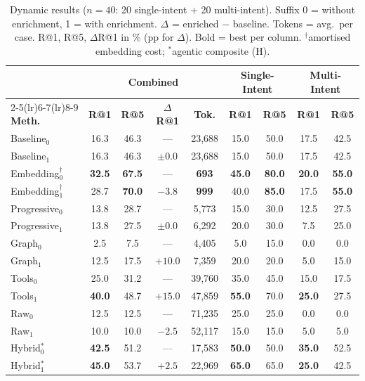\begin{table}[h]
  \renewcommand{\arraystretch}{1.0}
  \caption{Dynamic results ($n{=}40$: 20 single-intent + 20 multi-intent). Suffix 0 = without enrichment, 1 = with enrichment. $\Delta$ = enriched $-$ baseline. Tokens = avg.\ per case. R@1, R@5, $\Delta$R@1 in \% (pp for $\Delta$). Bold = best per column. $^{\dagger}$amortised embedding cost; $^{*}$agentic composite (H).}
  \label{tab:dy-results}
  \centering\footnotesize
  \setlength{\tabcolsep}{5pt}
  \begin{tabular}{@{} l cccc cc cc @{}}
  \toprule
  & \multicolumn{4}{c}{\textbf{Combined}} & \multicolumn{2}{c}{\textbf{Single-Intent}} & \multicolumn{2}{c}{\textbf{Multi-Intent}} \\
  \cmidrule(lr){2-5}\cmidrule(lr){6-7}\cmidrule(lr){8-9}
  \textbf{Meth.} & \textbf{R@1} & \textbf{R@5} & \textbf{$\Delta$R@1} & \textbf{Tok.} & \textbf{R@1} & \textbf{R@5} & \textbf{R@1} & \textbf{R@5} \\
  \midrule
  Baseline$_0$ & 16.3 & 46.3 & --- & 23{,}688 & 15.0 & 50.0 & 17.5 & 42.5 \\
  Baseline$_1$ & 16.3 & 46.3 & $\pm$0.0 & 23{,}688 & 15.0 & 50.0 & 17.5 & 42.5 \\
  \midrule
  Embedding$_0^{\dagger}$ & \textbf{32.5} & \textbf{67.5} & --- & \textbf{693} & \textbf{45.0} & \textbf{80.0} & \textbf{20.0} & \textbf{55.0} \\
  Embedding$_1^{\dagger}$ & 28.7 & \textbf{70.0} & $-3.8$ & \textbf{999} & 40.0 & \textbf{85.0} & 17.5 & \textbf{55.0} \\
  \midrule
  Progressive$_0$ & 13.8 & 28.7 & --- & 5{,}773 & 15.0 & 30.0 & 12.5 & 27.5 \\
  Progressive$_1$ & 13.8 & 27.5 & $\pm$0.0 & 6{,}292 & 20.0 & 30.0 & 7.5 & 25.0 \\
  \midrule
  Graph$_0$ & 2.5 & 7.5 & --- & 4{,}405 & 5.0 & 15.0 & 0.0 & 0.0 \\
  Graph$_1$ & 12.5 & 17.5 & $+10.0$ & 7{,}359 & 20.0 & 20.0 & 5.0 & 15.0 \\
  \midrule
  Tools$_0$ & 25.0 & 31.2 & --- & 39{,}760 & 35.0 & 45.0 & 15.0 & 17.5 \\
  Tools$_1$ & \textbf{40.0} & 48.7 & \textbf{$+15.0$} & 47{,}859 & \textbf{55.0} & 70.0 & \textbf{25.0} & 27.5 \\
  \midrule
  Raw$_0$ & 12.5 & 12.5 & --- & 71{,}235 & 25.0 & 25.0 & 0.0 & 0.0 \\
  Raw$_1$ & 10.0 & 10.0 & $-2.5$ & 52{,}117 & 15.0 & 15.0 & 5.0 & 5.0 \\
  \midrule
  Hybrid$_0^{*}$ & \textbf{42.5} & 51.2 & --- & 17{,}583 & \textbf{50.0} & 50.0 & \textbf{35.0} & 52.5 \\
  Hybrid$_1^{*}$ & \textbf{45.0} & 53.7 & $+2.5$ & 22{,}969 & \textbf{65.0} & 65.0 & \textbf{25.0} & 42.5 \\
  \bottomrule
  \end{tabular}
\end{table}


